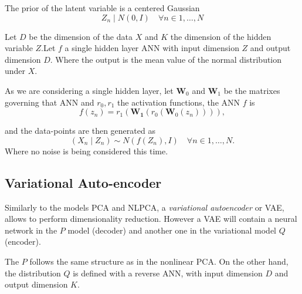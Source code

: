 The prior of the latent variable is a centered Gaussian
\[
  Z_{n} \mid N(0,I) \quad \forall n \in 1,\dots,N
\]

Let \(D\) be the dimension of the data \(X\) and \(K\) the dimension of the hidden variable \(Z\).Let \(f\) a single hidden layer ANN with input dimension \(Z\) and output dimension \(D\). Where the output is the mean value of the normal distribution under \(X\).

As we are considering a single hidden layer, let \(\bm{W}_{0}\) and \(\bm{W}_{1}\) be the matrixes governing that ANN and \(r_{0}, r_{1}\) the activation functions, the ANN \(f\) is
\[
  f(z_{n}) = r_{1}(\bm{W_{1}}(r_{0}(\bm{W}_{0}(z_{n})))),
\]

and the data-points are then generated as
\[
  (X_{n}\mid Z_{n}) \sim N(f(Z_{n}), I) \quad \forall n \in 1,\dots,N.
\]
Where no noise is being considered this time.

\subsection{Variational Auto-encoder}

Similarly to the models PCA and NLPCA, a \emph{variational autoencoder} or VAE, allows to perform dimensionality reduction. However a VAE will contain a neural network in the \(P\)  model (decoder) and another one in the variational model \(Q\) (encoder).

The \(P\) follows the same structure as in the nonlinear PCA. On the other hand, the  distribution \(Q\) is defined with a reverse ANN, with input dimension \(D\) and output dimension \(K\).
